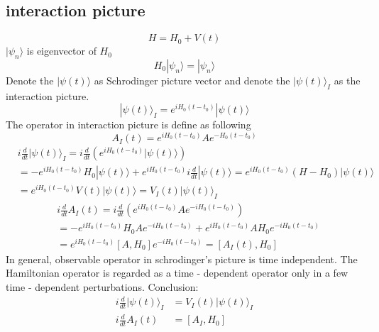 \documentclass[a4paper,11pt]{article}
\begin{document}
\subsection{interaction picture}
\begin{equation*}
  H=H_0+V(t)
\end{equation*}
$|\psi_n\rangle$ is eigenvector of $H_0$
\begin{equation*}
  H_0|\psi_n\rangle=|\psi_n\rangle
\end{equation*}
Denote the $|\psi(t)\rangle$ as Schrodinger picture vector and denote the $|\psi(t)\rangle_I$ as the interaction picture.
\begin{equation*}
  |\psi(t)\rangle_I=e^{iH_0(t-t_0)}|\psi(t)\rangle
\end{equation*}
The operator in interaction picture is define as following
\begin{equation*}
  A_I(t)=e^{iH_0(t-t_0)}Ae^{-H_0(t-t_0)}
\end{equation*}
\begin{equation*}
  \begin{split}
     &i\frac{d}{dt}|\psi(t)\rangle_I=i\frac{d}{dt}(e^{iH_0(t-t_0)}|\psi(t)\rangle)\\
       &=-e^{iH_0(t-t_0)}H_0|\psi(t)\rangle+e^{iH_0(t-t_0)}i\frac{d}{dt}|\psi(t)\rangle=e^{iH_0(t-t_0)}(H-H_0)|\psi(t)\rangle\\
       &=e^{iH_0(t-t_0)}V(t)|\psi(t)\rangle=V_I(t)|\psi(t)\rangle_I
  \end{split}
\end{equation*}
\begin{equation*}
  \begin{split}
     &i\frac{d}{dt}A_I(t)=i\frac{d}{dt}(e^{iH_0(t-t_0)}Ae^{-iH_0(t-t_0)})\\
       &=-e^{iH_0(t-t_0)}H_0Ae^{-iH_0(t-t_0)}+e^{iH_0(t-t_0)}AH_0e^{-iH_0(t-t_0)}\\
       &=e^{iH_0(t-t_0)}\left[A,H_0\right]e^{-iH_0(t-t_0)}=\left[A_I(t),H_0\right]
  \end{split}
\end{equation*}
In general, observable operator in schrodinger's picture is time independent. The Hamiltonian operator is regarded as a time - dependent operator only in a few time - dependent perturbations.
Conclusion:
\begin{equation*}
  \begin{split}
     i\frac{d}{dt}|\psi(t)\rangle_I&=V_I(t)|\psi(t)\rangle_I\\
     i\frac{d}{dt}A_I(t)&=\left[A_I,H_0\right]
  \end{split}
\end{equation*}
\end{document}
